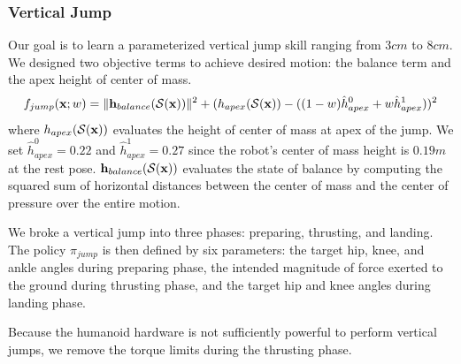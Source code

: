 \subsubsection{Vertical Jump}
Our goal is to learn a parameterized vertical jump skill ranging from
$3cm$ to $8cm$.
We designed two objective terms to achieve desired motion: the
balance term and the apex height of center of mass.
\begin{equation}
  f_{jump}(\mathbf{x}; w) =
  \|\mathbf{h}_{balance}(\mathcal{S}(\mathbf{x}))\|^2 + 
  ( h_{apex} (\mathcal{S}(\mathbf{x})) -  
  ((1-w)\hat{h}_{apex}^{0} + w\hat{h}_{apex}^{1}) )^2
\end{equation} 
  where $h_{apex}(\mathcal{S}(\mathbf{x}))$ evaluates the height of
  center of mass at apex of the jump. We set $\hat{h}_{apex}^{0} = 0.22$ and $\hat{h}_{apex}^{1} = 0.27$
  since the robot's center of mass height is $0.19m$ at the rest
  pose.
  $\mathbf{h}_{balance}(\mathcal{S}(\mathbf{x}))$ evaluates the state of
  balance by computing the squared sum of horizontal distances between
  the center of mass and the center of pressure over the entire
  motion.

We broke a vertical jump into
three phases: preparing, thrusting, and landing.
The policy $\pi_{jump}$ is
then defined by six parameters: the target hip, knee, and ankle angles during
preparing phase, the intended magnitude of force exerted to the ground during
thrusting phase, and the target hip and knee angles during landing phase.

Because the humanoid hardware is not sufficiently powerful to perform
vertical jumps, we remove the torque limits during the
thrusting phase.

